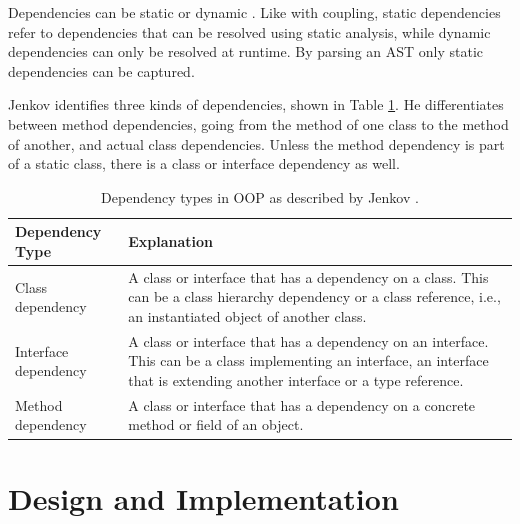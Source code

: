 \documentclass[a4paper,11pt,twoside]{article}
\theoremstyle{definition} %
\renewcommand{\cite}[1]{\citep{#1}}
\begin{document}
Dependencies can be static or dynamic \cite{jenkov-2014}. Like with coupling, static dependencies refer to dependencies that can be resolved using static analysis, while dynamic dependencies can only be resolved at runtime. By parsing an AST only static dependencies can be captured. 

Jenkov identifies three kinds of dependencies, shown in Table \ref{table:DependencyTypes}. He differentiates between method dependencies, going from the method of one class to the method of another, and actual class dependencies. Unless the method dependency is part of a static class, there is a class or interface dependency as well. 


\begin{table}[h!]
\begin{center}
\begin{tabular}{ m{4.5cm} | m{9cm}} 
 \hline
 \rowcolor{lightgray} Dependency Type & Explanation \\
 \hline
 Class dependency & A class or interface that has a dependency on a class. This can be a class hierarchy dependency or a class reference, i.e., an instantiated object of another class. \\
 \hline
 Interface dependency & A class or interface that has a dependency on an interface. This can be a class implementing an interface, an interface that is extending another interface or a type reference. \\
 \hline
 Method dependency & A class or interface that has a dependency on a concrete method or field of an object. \\
\end{tabular}
\end{center}
\caption{Dependency types in OOP as described by Jenkov \cite{jenkov-2014}.}
\label{table:DependencyTypes}
\end{table}

\newpage



\section{Design and Implementation} \label{Sec:DesignImplementation}
\end{document}
